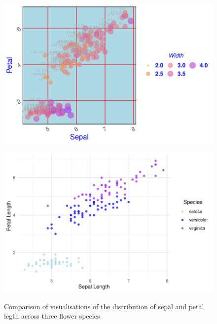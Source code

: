 \documentclass{article}\usepackage[]{graphicx}\usepackage[]{xcolor}
\newenvironment{knitrout}{}{} %
\begin{document}
\begin{figure}[htbp]
  \centering
  \begin{minipage}[b]{0.45\linewidth}
\begin{knitrout}\scriptsize
{}\color{fgcolor}

{\centering \includegraphics[width=\linewidth]{figure/beamer-messygraph-1} 

}


\end{knitrout}
    \label{fig:messygraph}
  \end{minipage}
  \hfill
  \begin{minipage}[b]{0.45\linewidth}
\begin{knitrout}\scriptsize
{}\color{fgcolor}

{\centering \includegraphics[width=\linewidth]{figure/beamer-cleargraph1-1} 

}


\end{knitrout}
    \label{fig:cleargraph1}
  \end{minipage}
\caption{Comparison of visualisations of the distribution of sepal and petal legth across three flower species}
\end{figure}
\end{document}
